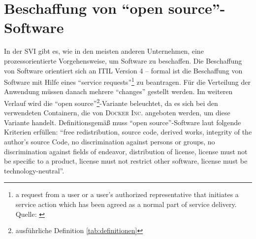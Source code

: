 \section{Beschaffung von \enquote{open source}-Software}
In der \ac{SVI} gibt es, wie in den meisten anderen Unternehmen, eine prozessorientierte Vorgehensweise, um Software zu beschaffen. Die Beschaffung von Software orientiert sich an \ac{ITIL} Version 4 -- formal ist die Beschaffung von Software mit Hilfe eines \enquote{service requests}\footnote{a request from a user or a user's authorized representative that initiates a service action which has been agreed as a normal part of service delivery. Quelle: \cite[][S.195]{axelos_limited_itil_2019}} zu beantragen. Für die Verteilung der Anwendung müssen danach mehrere \enquote{changes} gestellt werden. Im weiteren Verlauf wird die \enquote{open source}\footnote{ausführliche Definition \vref{tab:definitionen}}-Variante beleuchtet, da es sich bei den verwendeten Containern, die von \textsc{Docker Inc.} angeboten werden, um diese Variante handelt. Definitionsgemäß muss \enquote{open source}-Software laut \cite{opensource.org_open_2020} folgende Kriterien erfüllen: \enquote{free redistribution, source code, derived works, integrity of the author's source Code, no discrimination against persons or groups, no discrimination against fields of endeavor, distribution of license, license must not be specific to a product, license must not restrict other software, license must be technology-neutral}. \par
